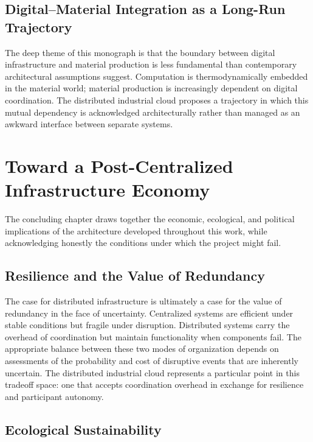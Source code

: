 \documentclass[12pt]{book}
\theoremstyle{definition}
\theoremstyle{remark}
\begin{document}
\section{Digital--Material Integration as a Long-Run Trajectory}

The deep theme of this monograph is that the boundary between digital
infrastructure and material production is less fundamental than
contemporary architectural assumptions suggest. Computation is
thermodynamically embedded in the material world; material production
is increasingly dependent on digital coordination. The distributed
industrial cloud proposes a trajectory in which this mutual
dependency is acknowledged architecturally rather than managed as
an awkward interface between separate systems.

\chapter{Toward a Post-Centralized Infrastructure Economy}

The concluding chapter draws together the economic, ecological, and
political implications of the architecture developed throughout this
work, while acknowledging honestly the conditions under which the
project might fail.

\section{Resilience and the Value of Redundancy}

The case for distributed infrastructure is ultimately a case for
the value of redundancy in the face of uncertainty. Centralized
systems are efficient under stable conditions but fragile under
disruption. Distributed systems carry the overhead of coordination
but maintain functionality when components fail. The appropriate
balance between these two modes of organization depends on
assessments of the probability and cost of disruptive events that
are inherently uncertain. The distributed industrial cloud represents
a particular point in this tradeoff space: one that accepts
coordination overhead in exchange for resilience and participant
autonomy.

\section{Ecological Sustainability}
\end{document}
